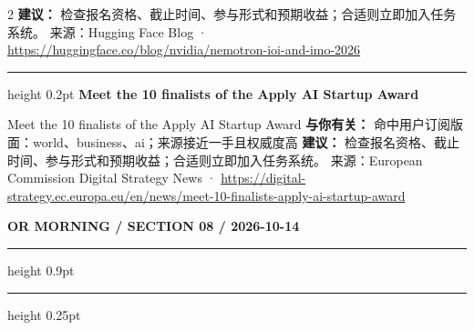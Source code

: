 \documentclass[10.5pt]{ctexart}
\begin{document}
\begin{multicols}{2}
\textbf{建议：} 检查报名资格、截止时间、参与形式和预期收益；合适则立即加入任务系统。
{\footnotesize\color{ormuted} 来源：Hugging Face Blog · \url{https://huggingface.co/blog/nvidia/nemotron-ioi-and-imo-2026}}
\vspace{2mm}
\hrule height 0.2pt
\vspace{2mm}
{\large\bfseries Meet the 10 finalists of the Apply AI Startup Award}\par
Meet the 10 finalists of the Apply AI Startup Award
\textbf{与你有关：} 命中用户订阅版面：world、business、ai；来源接近一手且权威度高
\textbf{建议：} 检查报名资格、截止时间、参与形式和预期收益；合适则立即加入任务系统。
{\footnotesize\color{ormuted} 来源：European Commission Digital Strategy News · \url{https://digital-strategy.ec.europa.eu/en/news/meet-10-finalists-apply-ai-startup-award}}
\end{multicols}
\newpage
{\small\bfseries OR MORNING / SECTION 08 / 2026-10-14}
\vspace{2mm}
\hrule height 0.9pt
\vspace{1.5mm}
\hrule height 0.25pt
\vspace{4mm}
\end{document}
